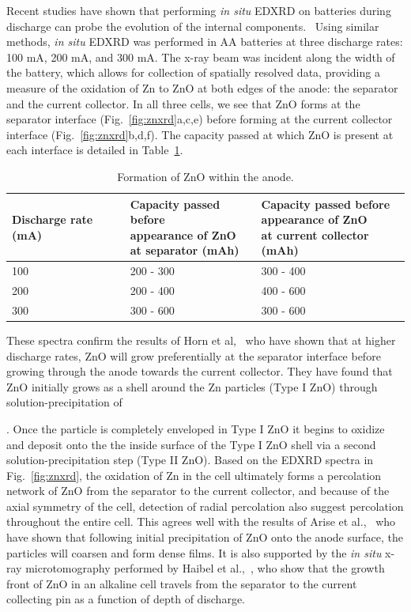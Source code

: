 {Recent studies have shown that performing \textit{in situ} EDXRD on batteries during discharge can probe the evolution of the internal components.~\cite{gallaway,haibel,Manke2007-yj} Using similar methods, \textit{in situ} EDXRD was performed in AA batteries at three discharge rates: 100 mA, 200 mA, and 300 mA. The x-ray beam was incident along the width of the battery, which allows for collection of spatially resolved data, providing a measure of the oxidation of Zn to ZnO at both edges of the anode: the separator and the current collector. In all three cells, we see that ZnO forms at the separator interface (Fig.~\ref{fig:znxrd}a,c,e) before forming at the current collector interface (Fig.~\ref{fig:znxrd}b,d,f). The capacity passed at which ZnO is present at each interface is detailed in Table~\ref{tab:znotable}.

\begin{table}[htb]
\centering
  \caption{\label{tab:znotable}Formation of ZnO within the anode.}
  \begin{tabular}{*{3}{l}}
    \hline
       Discharge rate (mA)&\specialcell{Capacity passed before\\appearance of ZnO\\at separator (mAh)}&\specialcell{Capacity passed before\\appearance of ZnO\\at current collector (mAh)}\\
    \hline
        100 & 200 - 300 & 300 - 400\\
        200 & 200 - 400 & 400 - 600\\
        300 & 300 - 600 & 300 - 600\\
  \end{tabular}
\end{table}


These spectra confirm the results of Horn et al,~\cite{horn} who have shown that at higher discharge rates, ZnO will grow preferentially at the separator interface before growing through the anode towards the current collector. They have found that ZnO initially grows as a shell around the Zn particles (Type I ZnO) through solution-precipitation of {. Once the particle is completely enveloped in Type I ZnO it begins to oxidize and deposit onto the the inside surface of the Type I ZnO shell via a second solution-precipitation step (Type II ZnO). Based on the EDXRD spectra in Fig.~\ref{fig:znxrd}, the oxidation of Zn in the cell ultimately forms a percolation network of ZnO from the separator to the current collector, and because of the axial symmetry of the cell, detection of radial percolation also suggest percolation throughout the entire cell. This agrees well with the results of Arise et al.,~\cite{arise} who have shown that following initial precipitation of ZnO onto the anode surface, the particles will coarsen and form dense films. It is also supported by the \textit{in situ} x-ray microtomography performed by Haibel et al.,~\cite{haibel}, who show that the growth front of ZnO in an alkaline cell travels from the separator to the current collecting pin as a function of depth of discharge.

}}
